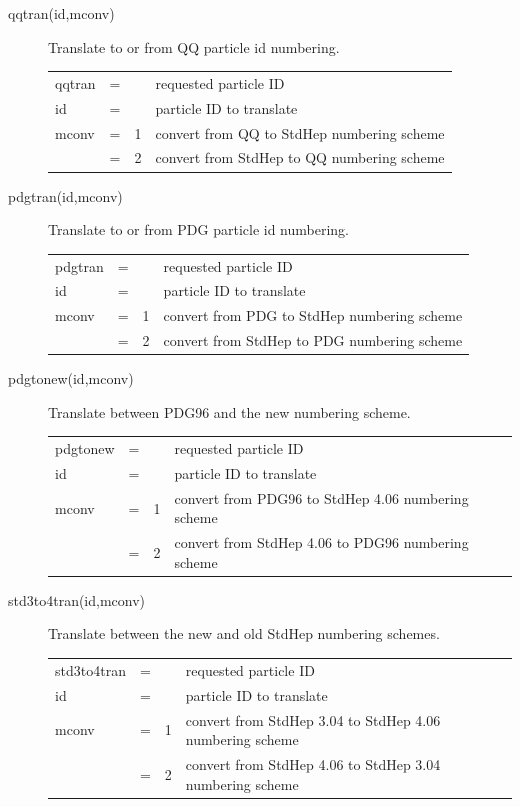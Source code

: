 \begin{description}
\item[qqtran(id,mconv)] Translate to or from QQ particle id numbering.

\begin{tabular}{lcll}
qqtran & = &   & requested particle ID \\
id     & = &   & particle ID to translate \\
mconv  & = & 1 & convert from QQ to StdHep numbering scheme \\
       & = & 2 & convert from StdHep to QQ numbering scheme \\
\end{tabular}

\item[pdgtran(id,mconv)] Translate to or from PDG particle id numbering.

\begin{tabular}{lcll}
pdgtran & = &   & requested particle ID \\
id      & = &   & particle ID to translate \\
mconv   & = & 1 & convert from PDG to StdHep numbering scheme \\
        & = & 2 & convert from StdHep to PDG numbering scheme \\
\end{tabular}

\item[pdgtonew(id,mconv)] Translate between PDG96 and the new numbering scheme.

\begin{tabular}{lcll}
pdgtonew & = &   & requested particle ID \\
id       & = &   & particle ID to translate \\
mconv    & = & 1 & convert from PDG96 to StdHep 4.06 numbering scheme \\
         & = & 2 & convert from StdHep 4.06 to PDG96 numbering scheme \\
\end{tabular}

\item[std3to4tran(id,mconv)] Translate between the new and old StdHep numbering schemes.

\begin{tabular}{lcll}
std3to4tran & = &   & requested particle ID \\
id          & = &   & particle ID to translate \\
mconv       & = & 1 & convert from StdHep 3.04 to StdHep 4.06 numbering scheme \\
            & = & 2 & convert from StdHep 4.06 to StdHep 3.04 numbering scheme \\
\end{tabular}

\end{description}


